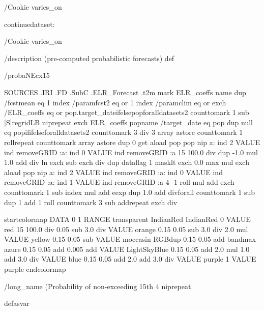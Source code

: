 \begin{ingrid}



/Cookie varies_on

continuedataset:


/Cookie varies_on

/description (pre-computed probabilistic forecasts) def

/probaNEcx15 {
 SOURCES .IRI .FD .SubC .ELR_Forecast .t2m
  mark ELR_coeffs {name dup /fcstmean eq 1 index /paramfcst2 eq or 1 index /paramclim eq or exch /ELR_coeffs eq or {pop}{.target_date}ifelse}{pop}foralldatasets2
      counttomark
       1 sub
       {[S]regridLB nip}repeat
    exch
    ELR_coeffs {pop}{name /target_date eq {pop}{ dup null eq {pop}if}ifelse}foralldatasets2 counttomark
              3 div
              {3 array astore counttomark 1 roll}repeat
       counttomark array astore
     dup
      0 get
      aload pop
        pop
       nip a:
        ind 2 VALUE
        ind removeGRID
        :a:
         ind 0 VALUE
         ind removeGRID
         :a
       15
        100.0 div
        dup
         -1.0 mul
         1.0 add
         div
        ln exch sub
       exch div
      dup dataflag
       1 masklt
       exch
       0.0 max
       mul
      exch
      {aload pop nip a: ind 2 VALUE ind removeGRID :a: ind 0 VALUE ind removeGRID :a: ind 1 VALUE ind removeGRID :a 4 -1 roll mul add exch counttomark 1 sub index mul add eexp dup 1.0 add div}forall counttomark
         1 sub
         dup
          1 add
          1 roll
         counttomark
          3 sub
          {add}repeat
       exch div

startcolormap DATA 0 1 RANGE transparent IndianRed IndianRed 0 VALUE red 15 100.0 div  0.05 sub 3.0 div VALUE orange 0.15 0.05 sub 3.0 div 2.0 mul VALUE yellow 0.15 0.05 sub VALUE moccasin RGBdup 0.15 0.05 add bandmax azure 0.15 0.05 add 0.005 add VALUE LightSkyBlue 0.15 0.05 add 2.0 mul 1.0 add 3.0 div VALUE blue 0.15 0.05 add 2.0 add 3.0 div VALUE purple 1 VALUE purple endcolormap

     /long_name (Probability of non-exceeding 15th %
      4 {nip}repeat
}defasvar


\end{ingrid}
